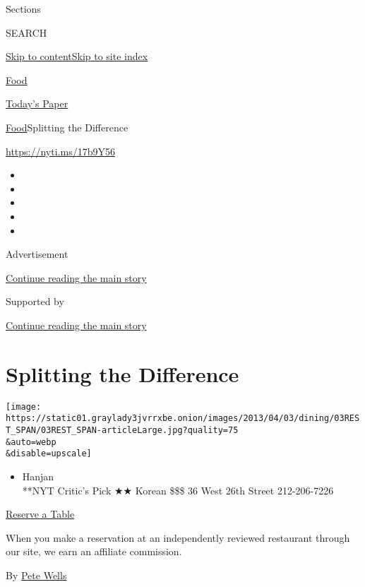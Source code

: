 Sections

SEARCH

\protect\hyperlink{site-content}{Skip to
content}\protect\hyperlink{site-index}{Skip to site index}

\href{https://www.nytimes3xbfgragh.onion/section/food}{Food}

\href{https://myaccount.nytimes3xbfgragh.onion/auth/login?response_type=cookie\&client_id=vi}{}

\href{https://www.nytimes3xbfgragh.onion/section/todayspaper}{Today's
Paper}

\href{/section/food}{Food}\textbar{}Splitting the Difference

\url{https://nyti.ms/17b9Y56}

\begin{itemize}
\item
\item
\item
\item
\item
\end{itemize}

Advertisement

\protect\hyperlink{after-top}{Continue reading the main story}

Supported by

\protect\hyperlink{after-sponsor}{Continue reading the main story}

\hypertarget{splitting-the-difference}{%
\section{Splitting the Difference}\label{splitting-the-difference}}

\texttt{[image: https://static01.graylady3jvrrxbe.onion/images/2013/04/03/dining/03REST\_SPAN/03REST\_SPAN-articleLarge.jpg?quality=75\\\&auto=webp\\\&disable=upscale]}

\begin{itemize}
\tightlist
\item
  Hanjan\\
  **NYT Critic's Pick ★★ Korean \$\$\$ 36 West 26th Street 212-206-7226
\end{itemize}

\href{http://www.opentable.com/single.aspx?ref=4201\&rid=169873}{Reserve
a Table}

When you make a reservation at an independently reviewed restaurant
through our site, we earn an affiliate commission.

By \href{https://www.nytimes3xbfgragh.onion/by/pete-wells}{Pete Wells}

